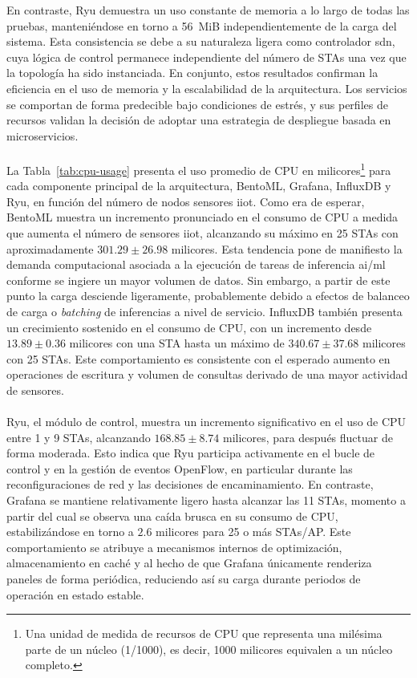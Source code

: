 En contraste, Ryu demuestra un uso constante de memoria a lo largo de todas las pruebas, manteniéndose en torno a 56~MiB independientemente de la carga del sistema. Esta consistencia se debe a su naturaleza ligera como controlador \gls{sdn}, cuya lógica de control permanece independiente del número de STAs una vez que la topología ha sido instanciada. En conjunto, estos resultados confirman la eficiencia en el uso de memoria y la escalabilidad de la arquitectura. Los servicios se comportan de forma predecible bajo condiciones de estrés, y sus perfiles de recursos validan la decisión de adoptar una estrategia de despliegue basada en microservicios.\\
\\
La Tabla~\ref{tab:cpu-usage} presenta el uso promedio de CPU en milicores\footnote{Una unidad de medida de recursos de CPU que representa una milésima parte de un núcleo (1/1000), es decir, 1000 milicores equivalen a un núcleo completo.} para cada componente principal de la arquitectura, BentoML, Grafana, InfluxDB y Ryu, en función del número de nodos sensores \gls{iiot}. Como era de esperar, BentoML muestra un incremento pronunciado en el consumo de CPU a medida que aumenta el número de sensores \gls{iiot}, alcanzando su máximo en 25 STAs con aproximadamente $301.29 \pm 26.98$ milicores. Esta tendencia pone de manifiesto la demanda computacional asociada a la ejecución de tareas de inferencia \gls{ai}/\gls{ml} conforme se ingiere un mayor volumen de datos. Sin embargo, a partir de este punto la carga desciende ligeramente, probablemente debido a efectos de balanceo de carga o \textit{batching} de inferencias a nivel de servicio. InfluxDB también presenta un crecimiento sostenido en el consumo de CPU, con un incremento desde $13.89 \pm 0.36$ milicores con una STA hasta un máximo de $340.67 \pm 37.68$ milicores con 25 STAs. Este comportamiento es consistente con el esperado aumento en operaciones de escritura y volumen de consultas derivado de una mayor actividad de sensores.\\
\\
Ryu, el módulo de control, muestra un incremento significativo en el uso de CPU entre 1 y 9 STAs, alcanzando $168.85 \pm 8.74$ milicores, para después fluctuar de forma moderada. Esto indica que Ryu participa activamente en el bucle de control y en la gestión de eventos OpenFlow, en particular durante las reconfiguraciones de red y las decisiones de encaminamiento. En contraste, Grafana se mantiene relativamente ligero hasta alcanzar las 11 STAs, momento a partir del cual se observa una caída brusca en su consumo de CPU, estabilizándose en torno a $2.6$ milicores para 25 o más STAs/AP. Este comportamiento se atribuye a mecanismos internos de optimización, almacenamiento en caché y al hecho de que Grafana únicamente renderiza paneles de forma periódica, reduciendo así su carga durante periodos de operación en estado estable.\\
